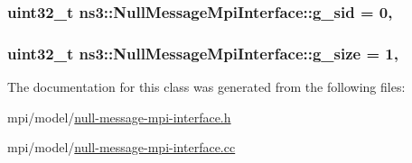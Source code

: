 \subsubsection[{\texorpdfstring{g\+\_\+sid}{g_sid}}]{\setlength{\rightskip}{0pt plus 5cm}uint32\+\_\+t ns3\+::\+Null\+Message\+Mpi\+Interface\+::g\+\_\+sid = 0\hspace{0.3cm}{\ttfamily [static]}, {\ttfamily [private]}}\hypertarget{classns3_1_1NullMessageMpiInterface_aba703fa18812299f38a533175e84789d}{}\label{classns3_1_1NullMessageMpiInterface_aba703fa18812299f38a533175e84789d}
\subsubsection[{\texorpdfstring{g\+\_\+size}{g_size}}]{\setlength{\rightskip}{0pt plus 5cm}uint32\+\_\+t ns3\+::\+Null\+Message\+Mpi\+Interface\+::g\+\_\+size = 1\hspace{0.3cm}{\ttfamily [static]}, {\ttfamily [private]}}\hypertarget{classns3_1_1NullMessageMpiInterface_acbc2b4d714259601b86e1bc1bc13e26a}{}\label{classns3_1_1NullMessageMpiInterface_acbc2b4d714259601b86e1bc1bc13e26a}


The documentation for this class was generated from the following files\+:\begin{DoxyCompactItemize}
\item 
mpi/model/\hyperlink{null-message-mpi-interface_8h}{null-\/message-\/mpi-\/interface.\+h}\item 
mpi/model/\hyperlink{null-message-mpi-interface_8cc}{null-\/message-\/mpi-\/interface.\+cc}\end{DoxyCompactItemize}
